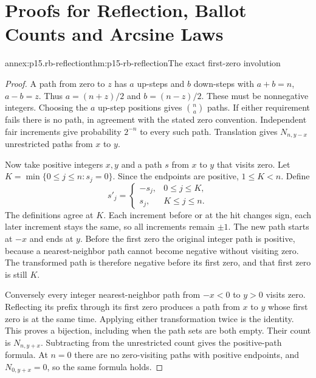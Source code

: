 \section{Proofs for Reflection, Ballot Counts and Arcsine Laws}
\label{sec:annex-p15-reflection-and-ballot-counts}

\begin{annexitem}{annex:p15.rb-reflection}{thm:p15-rb-reflection}{The exact first-zero involution}
\begin{proof}
A path from zero to \(z\) has \(a\) up-steps and \(b\) down-steps
with \(a+b=n\), \(a-b=z\). Thus \(a=(n+z)/2\) and
\(b=(n-z)/2\). These must be nonnegative integers. Choosing
the \(a\) up-step positions gives \(\binom na\) paths.
If either requirement fails there is no path, in agreement
with the stated zero convention. Independent fair increments
give probability \(2^{-n}\) to every such path.
Translation gives \(N_{n,y-x}\) unrestricted paths from \(x\)
to \(y\).

Now take positive integers \(x,y\) and a path \(s\) from \(x\)
to \(y\) that visits zero. Let
\(K=\min\{0\leq j\leq n:s_j=0\}\).
Since the endpoints are positive, \(1\leq K<n\).
Define
\[
 s'_j=
 \begin{cases}
 -s_j,&0\leq j\leq K,\\
 s_j,&K\leq j\leq n.
 \end{cases}
 \]
The definitions agree at \(K\). Each increment before or at
the hit changes sign, each later increment stays the same,
so all increments remain \(\pm1\).
The new path starts at \(-x\) and ends at \(y\).
Before the first zero the original integer path is positive,
because a nearest-neighbor path cannot become negative without
visiting zero. The transformed path is therefore negative
before its first zero, and that first zero is still \(K\).

Conversely every integer nearest-neighbor path from \(-x<0\)
to \(y>0\) visits zero. Reflecting its prefix through its first
zero produces a path from \(x\) to \(y\) whose first zero is
at the same time. Applying either transformation twice is the
identity. This proves a bijection, including when the path
sets are both empty. Their count is \(N_{n,y+x}\).
Subtracting from the unrestricted count gives the positive-path
formula. At \(n=0\) there are no zero-visiting paths with
positive endpoints, and \(N_{0,y+x}=0\), so the same formula holds.
\end{proof}
\end{annexitem}

